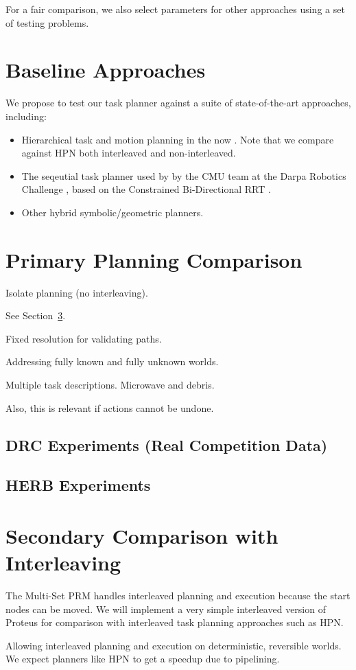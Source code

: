 For a fair comparison,
we also select parameters for other approaches using a set of testing
problems.

\section{Baseline Approaches}

We propose to test our task planner against a suite of
state-of-the-art approaches,
including:
\begin{itemize}
\item Hierarchical task and motion planning in the now
   \cite{kaelbling2011inthenow}.
   Note that we compare against HPN both
   interleaved and non-interleaved.
\item The seqeutial task planner used by by the CMU team
   at the Darpa Robotics Challenge
   \cite{dellin2014drc},
   based on the Constrained Bi-Directional RRT
   \cite{berenson2009manifolds}.
\item Other hybrid symbolic/geometric planners.
\end{itemize}

\section{Primary Planning Comparison}
\label{sec:exp-noninterleaved}

Isolate planning (no interleaving).

See Section~\ref{sec:exp-interleaved}.

Fixed resolution for validating paths.

Addressing fully known and fully unknown worlds.

Multiple task descriptions.
Microwave and debris.

Also, this is relevant if actions cannot be undone.

\subsection{DRC Experiments (Real Competition Data)}

\subsection{HERB Experiments}

\section{Secondary Comparison with Interleaving}
\label{sec:exp-interleaved}

The Multi-Set PRM handles interleaved planning and execution
because the start nodes can be moved.
We will implement a very simple interleaved version of Proteus
for comparison with interleaved task planning approaches
such as HPN.

Allowing interleaved planning and execution
on deterministic, reversible worlds.
We expect planners like HPN to get a speedup
due to pipelining.
